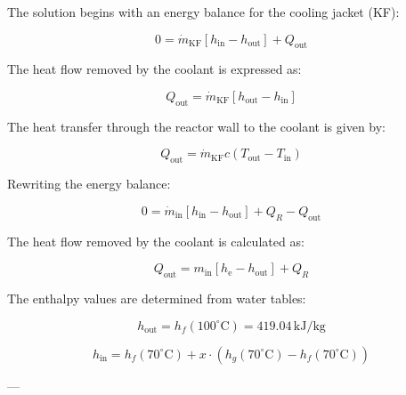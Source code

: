 The solution begins with an energy balance for the cooling jacket (KF):  

\[
0 = \dot{m}_{\text{KF}} \left[ h_{\text{in}} - h_{\text{out}} \right] + Q_{\text{out}}
\]  

The heat flow removed by the coolant is expressed as:  

\[
Q_{\text{out}} = \dot{m}_{\text{KF}} \left[ h_{\text{out}} - h_{\text{in}} \right]
\]  

The heat transfer through the reactor wall to the coolant is given by:  

\[
Q_{\text{out}} = \dot{m}_{\text{KF}} c \left( T_{\text{out}} - T_{\text{in}} \right)
\]  

Rewriting the energy balance:  

\[
0 = \dot{m}_{\text{in}} \left[ h_{\text{in}} - h_{\text{out}} \right] + Q_R - Q_{\text{out}}
\]  

The heat flow removed by the coolant is calculated as:  

\[
Q_{\text{out}} = m_{\text{in}} \left[ h_{\text{e}} - h_{\text{out}} \right] + Q_R
\]  

The enthalpy values are determined from water tables:  

\[
h_{\text{out}} = h_f(100^\circ\text{C}) = 419.04 \, \text{kJ/kg}
\]  

\[
h_{\text{in}} = h_f(70^\circ\text{C}) + x \cdot \left( h_g(70^\circ\text{C}) - h_f(70^\circ\text{C}) \right)
\]  

---